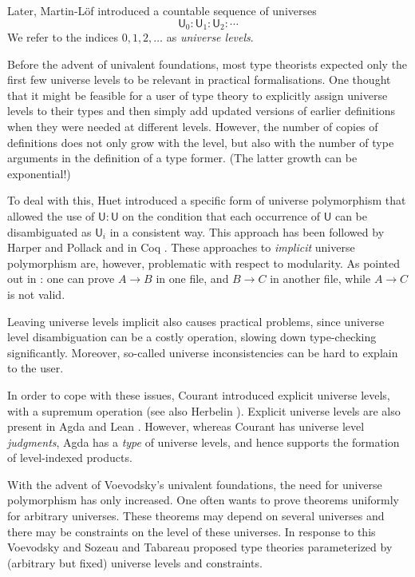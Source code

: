 \documentclass[11pt,a4paper]{article}
\theoremstyle{definition}
\newcommand{\UU}{\mathsf{U}}
\begin{document}
Later, Martin-L\"of \cite{martinlof:predicative} introduced a countable sequence of universes
$$
\UU_0 : \UU_1 : \UU_2 : \cdots
$$
We refer to the indices $0, 1, 2, \ldots$ as {\em universe levels}.

Before the advent of univalent foundations, most type theorists expected
only the first few universe levels to be relevant in practical formalisations.
One thought that it might be feasible for a user of
type theory to explicitly assign universe levels to their types and
then simply add updated versions of earlier
definitions when they were needed at different levels.
However, the number of copies of definitions does not only grow with the level,
but also with the number of type arguments in the definition of a type former.
(The latter growth can be exponential!)

To deal with this, Huet \cite{Huet87} introduced a specific form of
universe polymorphism that allowed the use of $\UU:\UU$
on the condition that each occurrence of $\UU$ can be disambiguated
as $\UU_i$ in a consistent way.
This approach has been followed by Harper and Pollack \cite{HarperP91} and
in Coq \cite{coq:general}.
These  approaches to \emph{implicit} universe polymorphism are, however,
problematic with respect to modularity. As pointed out in \cite{Courant02,Simpson04}:
one can prove $A\rightarrow B$ in one file, and $B\rightarrow C$ in
another file, while $A\rightarrow C$ is not valid.

Leaving universe levels implicit also causes practical problems,
since universe level disambiguation can be a costly operation,
slowing down type-checking significantly.
Moreover, so-called universe inconsistencies can be hard to explain to the user.

In order to cope with these issues, Courant \cite{Courant02}
introduced explicit universe levels,
with a supremum operation (see also Herbelin \cite{herbelin05}).
Explicit universe levels are also present in Agda \cite{agda-manual} and
Lean \cite{moura:lean,Carneiro19}.
However, whereas Courant has
universe level \emph{judgments}, Agda has a \emph{type} of
universe levels, and hence supports the formation of level-indexed products.

With the advent of Voevodsky's univalent foundations,
the need for universe polymorphism has only increased.
One often wants to prove theorems uniformly for arbitrary universes. These theorems may depend on several universes and there may be constraints on the level of these universes.
In response to this Voevodsky  \cite{VV} and Sozeau and Tabareau \cite{SozeauTabareau:coq} proposed type theories parameterized by
(arbitrary but fixed) universe levels and constraints.
\end{document}
